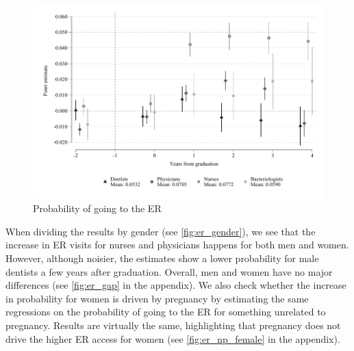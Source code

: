 \documentclass[12pt, a4paper]{article}
\begin{document}
\begin{figure}[H]
\caption{Probability of going to the ER}\label{fig:er}
\centering 
\includegraphics[width=\textwidth]{Figures/Callaway SantAnna/ES_urg_all.pdf}
\end{figure}

When dividing the results by gender (see \autoref{fig:er_gender}), we see that the increase in ER visits for nurses and physicians happens for both men and women. However, although noisier, the estimates show a lower probability for male dentists a few years after graduation. Overall, men and women have no major differences (see \autoref{fig:er_gap} in the appendix). We also check whether the increase in probability for women is driven by pregnancy by estimating the same regressions on the probability of going to the ER for something unrelated to pregnancy. Results are virtually the same, highlighting that pregnancy does not drive the higher ER access for women (see \autoref{fig:er_np_female} in the appendix). 
\end{document}

